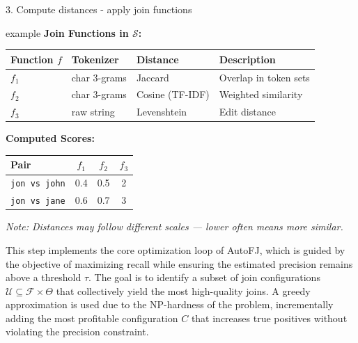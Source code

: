 \documentclass[8pt]{beamer} %
\begin{document}
\begin{frame}{3. Compute distances - apply join functions}
\begin{beamercolorbox}[rounded=true, shadow=true, leftskip=1em, rightskip=1em]{example}
		\vspace{0.5em}
		\textbf{Join Functions in $\mathcal{S}$:}
		\begin{tabular}{llll}
			\textbf{Function $f$} & \textbf{Tokenizer} & \textbf{Distance} & \textbf{Description} \\
			\hline
			$f_1$ & char 3-grams & Jaccard & Overlap in token sets \\
			$f_2$ & char 3-grams & Cosine (TF-IDF) & Weighted similarity \\
			$f_3$ & raw string   & Levenshtein & Edit distance \\
		\end{tabular}
		
		\vspace{0.5em}
		\textbf{Computed Scores:}
		\begin{tabular}{lccc}
			\textbf{Pair} & $f_1$ & $f_2$ & $f_3$ \\
			\hline
			\texttt{jon vs john} & 0.4 & 0.5 & 2 \\
			\texttt{jon vs jane} & 0.6 & 0.7 & 3 \\
		\end{tabular}
		
		\vspace{0.5em}
		\textit{Note: Distances may follow different scales — lower often means more similar.}
	\end{beamercolorbox}
\end{frame}


\begin{frame}
	This step implements the core optimization loop of AutoFJ, which is guided by the objective of maximizing recall while ensuring the estimated precision remains above a threshold $\tau$. The goal is to identify a subset of join configurations $\mathcal{U} \subseteq \mathcal{F} \times \Theta$ that collectively yield the most high-quality joins. A greedy approximation is used due to the NP-hardness of the problem, incrementally adding the most profitable configuration $C$ that increases true positives without violating the precision constraint.
	
\end{frame}
\end{document}
